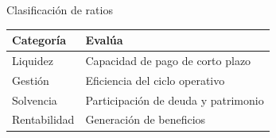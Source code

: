 \begin{frame}{Clasificación de ratios}
\begin{center}
\begin{tabular}{ll}
\toprule
Categoría & Evalúa \\
\midrule
Liquidez & Capacidad de pago de corto plazo \\
Gestión & Eficiencia del ciclo operativo \\
Solvencia & Participación de deuda y patrimonio \\
Rentabilidad & Generación de beneficios \\
\bottomrule
\end{tabular}
\end{center}
\end{frame}
